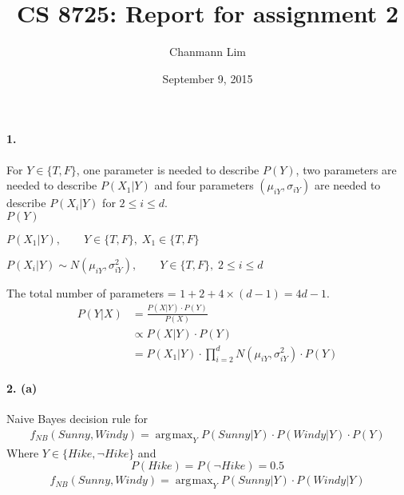 \documentclass[a4paper]{article}
\DeclareMathOperator*{\argmax}{\arg\!\max}
\begin{document}
\title{CS 8725: Report for assignment 2}
\author{Chanmann Lim}
\date{September 9, 2015}
\maketitle

\paragraph{1.} For $Y \in \{T, F\}$, one parameter is needed to describe $P(Y)$, two parameters are needed to describe $P(X_1|Y)$ and four parameters $(\mu_{iY}, \sigma_{iY})$ are needed to describe $P(X_i|Y)$ for $2 \leq i \leq d$.\\

	$ P(Y) $
	
	$ P(X_1|Y), \qquad Y \in \{T, F\}, \; X_1 \in \{T, F\} $
	
	$ P(X_i|Y) \sim N(\mu_{iY}, \sigma_{iY}^2), \qquad Y \in \{T, F\}, \; 2 \leq i \leq d $
	
	The total number of parameters = $1 + 2 + 4 \times (d-1) = 4d - 1 $.
	\begin{align}
		P(Y|X) &= \frac{P(X|Y) \cdot P(Y)}{P(X)} \\
			&\propto P(X|Y) \cdot P(Y) \\
			&= P(X_1|Y) \cdot \prod_{i=2}^d N(\mu_{iY}, \sigma_{iY}^2) \cdot P(Y)
	\end{align} 

\paragraph{2. (a)} Naive Bayes decision rule for \\
	\begin{align}
		f_{NB}(Sunny, Windy) = \argmax_{Y} P(Sunny|Y) \cdot P(Windy|Y) \cdot P(Y)
	\end{align}
	Where $Y \in \{Hike, \neg Hike\}$ and 
	$$ P(Hike) = P(\neg Hike) = 0.5 $$
	\begin{align}
		f_{NB}(Sunny, Windy) = \argmax_{Y} P(Sunny|Y) \cdot P(Windy|Y)
	\end{align}
	
\end{document}
